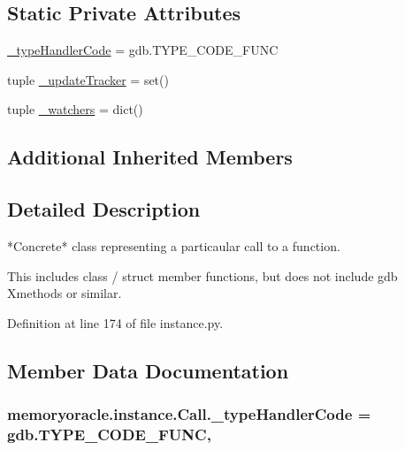 \subsection*{Static Private Attributes}
\begin{DoxyCompactItemize}
\item 
\hyperlink{classmemoryoracle_1_1instance_1_1Call_a17f99d3b609b7411bb0a02bac6fe21b7}{\+\_\+type\+Handler\+Code} = gdb.\+T\+Y\+P\+E\+\_\+\+C\+O\+D\+E\+\_\+\+F\+U\+N\+C
\item 
tuple \hyperlink{classmemoryoracle_1_1instance_1_1Call_a21a428f75b5e01781715644c36667ba1}{\+\_\+update\+Tracker} = set()
\item 
tuple \hyperlink{classmemoryoracle_1_1instance_1_1Call_a5584ef8567d815a51e59216116b0c70c}{\+\_\+watchers} = dict()
\end{DoxyCompactItemize}
\subsection*{Additional Inherited Members}


\subsection{Detailed Description}
\begin{DoxyVerb}*Concrete* class representing a particaular call to a function.

This includes class / struct member functions, but does not
include gdb Xmethods or similar.
\end{DoxyVerb}
 

Definition at line 174 of file instance.\+py.



\subsection{Member Data Documentation}
\hypertarget{classmemoryoracle_1_1instance_1_1Call_a17f99d3b609b7411bb0a02bac6fe21b7}{}
\subsubsection[{\+\_\+type\+Handler\+Code}]{\setlength{\rightskip}{0pt plus 5cm}memoryoracle.\+instance.\+Call.\+\_\+type\+Handler\+Code = gdb.\+T\+Y\+P\+E\+\_\+\+C\+O\+D\+E\+\_\+\+F\+U\+N\+C\hspace{0.3cm}{\ttfamily [static]}, {\ttfamily [private]}}\label{classmemoryoracle_1_1instance_1_1Call_a17f99d3b609b7411bb0a02bac6fe21b7}



